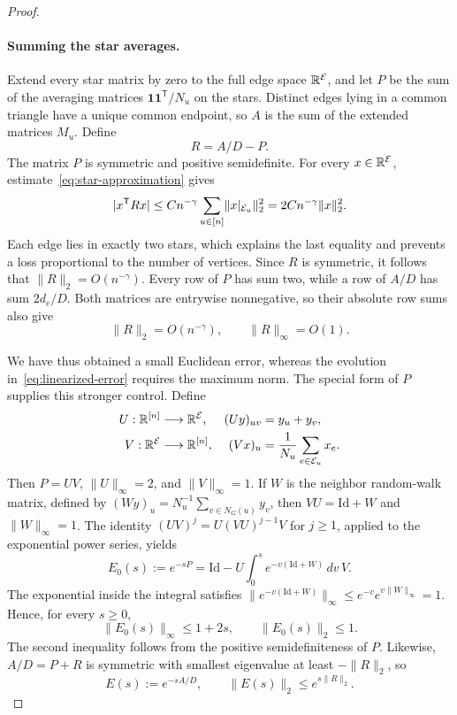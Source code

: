 \begin{proof}
\paragraph{Summing the star averages.}
Extend every star matrix by zero to the full edge space
$\mathbb R^{\mathcal E}$, and let $P$ be the sum of the averaging matrices
$\mathbf1\mathbf1^{\mathsf T}/N_u$ on the stars.  Distinct edges
lying in a common triangle have a unique common endpoint, so $A$ is
the sum of the extended matrices $M_u$.  Define
\[
 R=A/D-P.
\]
The matrix $P$ is symmetric and positive semidefinite.  For every
$x\in\mathbb R^{\mathcal E}$, estimate~\eqref{eq:star-approximation} gives
\[
 |x^{\mathsf T}Rx|
 \le Cn^{-\gamma}\sum_{u\in[n]}
          \lVert x|_{\mathcal E_u}\rVert_2^2
 =2Cn^{-\gamma}\lVert x\rVert_2^2.
\]
Each edge lies in exactly two stars, which explains the last equality
and prevents a loss proportional to the number of vertices.  Since
$R$ is symmetric, it follows that $\lVert R\rVert_2=O(n^{-\gamma})$.
Every row of $P$ has sum two, while a row of $A/D$ has sum $2d_e/D$.
Both matrices are entrywise nonnegative, so their absolute row sums
also give
\begin{equation}\label{eq:R-norms}
 \lVert R\rVert_2=O(n^{-\gamma}),\qquad
 \lVert R\rVert_\infty=O(1).
\end{equation}

We have thus obtained a small Euclidean error, whereas the evolution
in~\eqref{eq:linearized-error} requires the maximum norm.  The special
form of $P$ supplies this stronger control.  Define
\[
 \begin{aligned}
 U:\mathbb R^{[n]}&\longrightarrow\mathbb R^{\mathcal E},
 & (Uy)_{uv}&=y_u+y_v,\\
 V:\mathbb R^{\mathcal E}&\longrightarrow\mathbb R^{[n]},
 & (Vx)_u&=\frac1{N_u}\sum_{e\in\mathcal E_u}x_e.
 \end{aligned}
\]
Then $P=UV$, $\lVert U\rVert_\infty=2$, and
$\lVert V\rVert_\infty=1$.  If $W$ is the neighbor random-walk
matrix, defined by
$(Wy)_u=N_u^{-1}\sum_{v\in N_G(u)}y_v$, then
$VU=\mathrm{Id}+W$ and $\lVert W\rVert_\infty=1$.
The identity $(UV)^j=U(VU)^{j-1}V$ for $j\ge1$, applied to the
exponential power series, yields
\[
 E_0(s):=e^{-sP}
 =\mathrm{Id}-U\int_0^s e^{-v(\mathrm{Id}+W)}\,dv\,V.
\]
The exponential inside the integral satisfies
$\lVert e^{-v(\mathrm{Id}+W)}\rVert_\infty
\le e^{-v}e^{v\lVert W\rVert_\infty}=1$.
Hence, for every $s\ge0$,
\begin{equation}\label{eq:average-semigroup}
 \lVert E_0(s)\rVert_\infty\le1+2s,
 \qquad \lVert E_0(s)\rVert_2\le1.
\end{equation}
The second inequality follows from the positive semidefiniteness of
$P$.  Likewise, $A/D=P+R$ is symmetric with smallest eigenvalue at
least $-\lVert R\rVert_2$, so
\begin{equation}\label{eq:full-semigroup-l2}
 E(s):=e^{-sA/D},\qquad
 \lVert E(s)\rVert_2\le e^{s\lVert R\rVert_2}.
\end{equation}


\end{proof}
